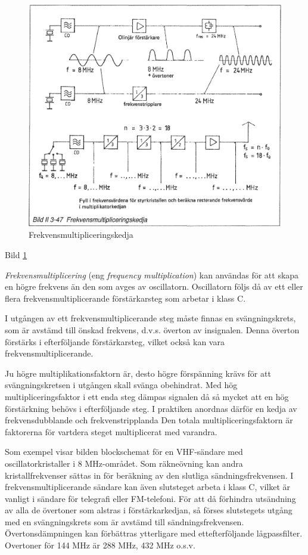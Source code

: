 \begin{figure}[h]
\begin{center}
\includegraphics[width=14cm]{images/bild_2_3-47}
\caption{Frekvensmultipliceringskedja}
\label{fig:BildII3-47}
\end{center}
\end{figure}

Bild \ref{fig:BildII3-47}

\emph{Frekvensmultiplicering} (eng \emph{frequency multiplication}) kan
användas för att skapa en högre frekvens än den som avges av oscillatorn.
Oscillatorn följs då av ett eller flera frekvensmultiplicerande förstärkarsteg
som arbetar i klass C.

I utgången av ett frekvensmultiplicerande steg måste finnas en
svängningskrets, som är avstämd till önskad frekvens, d.v.s. överton
av insignalen. Denna överton förstärks i efterföljande förstärkarsteg,
vilket också kan vara frekvensmultiplicerande.

Ju högre multiplikationsfaktorn är, desto högre förspänning krävs för
att svängningskretsen i utgången skall svänga obehindrat.  Med hög
multipliceringsfaktor i ett enda steg dämpas signalen då så mycket att
en hög förstärkning behövs i efterföljande steg. I praktiken anordnas
därför en kedja av frekvensdubblande och frekvenstripplanda Den totala
multipliceringsfaktorn är faktorerna för vartdera steget multiplicerat
med varandra.

Som exempel visar bilden blockschemat för en VHF-sändare med
oscillatorkristaller i 8 MHz-området. Som räkneövning kan andra
kristallfrekvenser sättas in för beräkning av den slutliga
sändningsfrekvensen. I frekvensmultiplicerande sändare kan även
slutsteget arbeta i klass C, vilket är vanligt i sändare för telegrafi
eller FM-telefoni. För att då förhindra utsändning av alla de
övertoner som alstras i förstärkarkedjan, så förses slutstegets utgång
med en svängningskrets som är avstämd till sändningsfrekvensen.
Övertonsdämpningen kan förbättras ytterligare med ettefterföljande
lågpassfilter. Overtoner för 144 MHz är 288 MHz, 432 MHz o.s.v.


